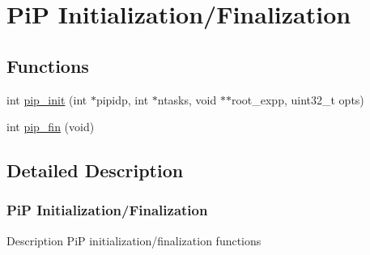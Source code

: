 \hypertarget{group__pip-0-init-fin}{\section{Pi\-P Initialization/\-Finalization}
\label{group__pip-0-init-fin}
}
\subsection*{Functions}
\begin{DoxyCompactItemize}
\item 
int \hyperlink{group__pip-0-init-fin_ga20439326ff318c2dd0752bd544dca0e2}{pip\-\_\-init} (int $\ast$pipidp, int $\ast$ntasks, void $\ast$$\ast$root\-\_\-expp, uint32\-\_\-t opts)
\item 
int \hyperlink{group__pip-0-init-fin_gac4654282785abb9434ce81573fdf16ed}{pip\-\_\-fin} (void)
\end{DoxyCompactItemize}


\subsection{Detailed Description}
\hypertarget{pip-intialize-finalize}{}\subsubsection{Pi\-P Initialization/\-Finalization}\label{pip-intialize-finalize}
\begin{DoxyParagraph}{Description}
Pi\-P initialization/finalization functions 
\end{DoxyParagraph}


